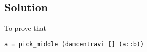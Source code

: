 \subsection*{Solution}

To prove that
\begin{center}
    \texttt{a = pick\_middle (damcentravi [] (a::b))}
\end{center}
